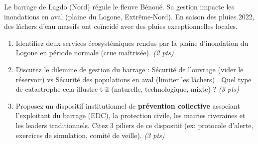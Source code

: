 \documentclass[11pt]{article}
\begin{document}
\begin{exercice}
Le barrage de Lagdo (Nord) régule le fleuve Bénoué. Sa gestion impacte les inondations en aval (plaine du Logone, Extrême-Nord). En saison des pluies 2022, des lâchers d'eau massifs ont coïncidé avec des pluies exceptionnelles locales.

\begin{enumerate}
    \item Identifiez deux services écosystémiques rendus par la plaine d'inondation du Logone en période normale (crue maîtrisée). \textit{(2 pts)}
    \item Discutez le dilemme de gestion du barrage : \og Sécurité de l'ouvrage (vider le réservoir) vs Sécurité des populations en aval (limiter les lâchers) \fg. Quel type de catastrophe cela illustre-t-il (naturelle, technologique, mixte) ? \textit{(3 pts)}
    \item Proposez un dispositif institutionnel de \textbf{prévention collective} associant l'exploitant du barrage (EDC), la protection civile, les mairies riveraines et les leaders traditionnels. Citez 3 piliers de ce dispositif (ex: protocole d'alerte, exercices de simulation, comité de veille). \textit{(3 pts)}
\end{enumerate}
\end{exercice}
\end{document}
